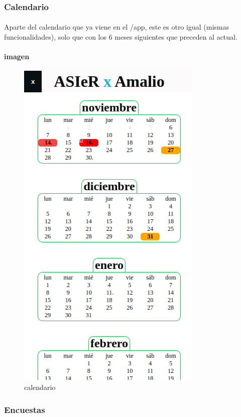 \documentclass[a4paper]{article}
\begin{document}
\subsubsection[/app/curso/calendario]{Calendario}
\paragraph{}
Aparte del calendario que ya viene en el /app, este es otro igual (mismas funcionalidades),
solo que con los 6 meses siguientes que preceden al actual.
\paragraph{imagen}
\begin{figure}[ht]
    \includegraphics[scale=0.5]{./assets/calendario.jpg}
    \centering
    \caption{calendario}
    \label{fig:calendario}
 \end{figure}
 \newpage
 \subsubsection[/app/curso/encuestas]{Encuestas}
\end{document}

